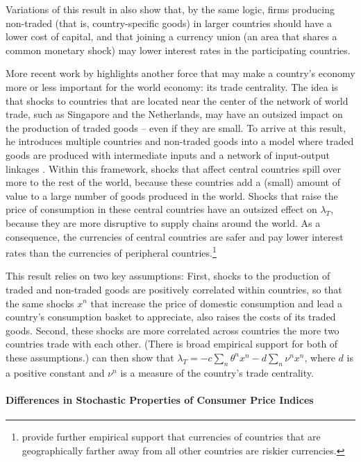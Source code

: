\documentclass{ar-1col}
\begin{document}
Variations of this result in \citet{Hassan2013} also show that, by the same logic, firms producing non-traded (that is, country-specific goods) in larger countries should have a lower cost of capital, and that joining a currency union (an area that shares a common monetary shock) may lower interest rates in the participating countries.

More recent work by \citet{Richmond2019} highlights another force that may make a country's economy more or less important for the world economy: its trade centrality. The idea is that shocks to countries that are located near the center of the network of world trade, such as Singapore and the Netherlands, may have an outsized impact on the production of traded goods -- even if they are small. To arrive at this result, he introduces multiple countries and non-traded goods into a model where traded goods are produced with intermediate inputs and a network of input-output linkages \citep{LongPlosser1983, Acemogluetal2012}. Within this framework, shocks that affect central countries spill over more to the rest of the world, because these countries add a (small) amount of value to a large number of goods produced in the world. Shocks that raise the price of consumption in these central countries have an outsized effect on  $\lambda_T$, because they are more disruptive to supply chains around the world. As a consequence, the currencies of central countries are safer and pay lower interest rates than the currencies of peripheral countries.\footnote{\citet{LustigRichmond2020} provide further empirical support that currencies of countries that are geographically farther away from all other countries are riskier currencies.}   

This result relies on two key assumptions: First, shocks to the production of traded and non-traded goods are positively correlated within countries, so that the same shocks $x^n$ that increase the price of domestic consumption and lead a country's consumption basket to appreciate, also raises the costs of its traded goods. Second, these shocks are more correlated across countries the more two countries trade with each other. (There is broad empirical support for both of these assumptions.) \citet{Richmond2019} can then show that $\lambda_{T} = -c \sum_{n} \theta^n x^n- d\sum_{n} \nu^n x^n$, where $d$ is a positive constant and $\nu^n$ is a measure of the country's trade centrality.


\paragraph*{Differences in Stochastic Properties of Consumer Price Indices}
\end{document}
